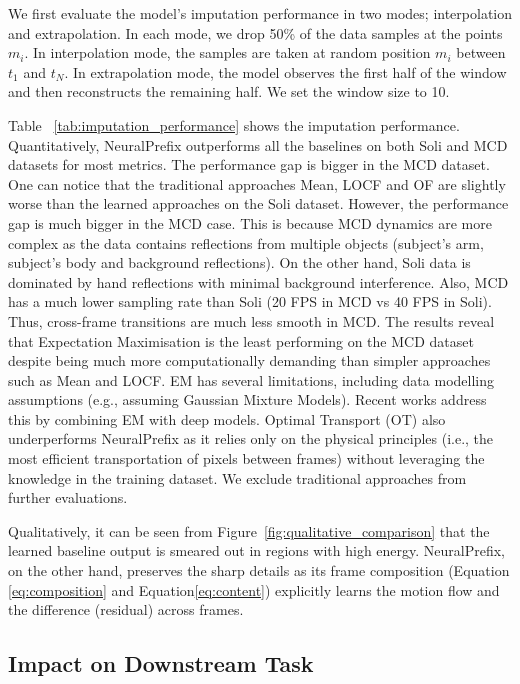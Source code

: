\documentclass[10pt, conference, compsocconf]{IEEEtran}
\def\update#1{#1}
\begin{document}
We first evaluate the model's imputation performance in two modes; interpolation and extrapolation. In each mode, we drop 50\% of the data samples at the points ${m_i}$. In interpolation mode, the samples are taken at random position ${m_i}$  between $t_1$ and $t_N$. In extrapolation mode, the model observes the first half of the window and then reconstructs the remaining half. We set the window size to 10.


Table~ \ref{tab:imputation_performance} shows the imputation performance.  \update {Quantitatively, NeuralPrefix outperforms all the baselines on both Soli and MCD datasets for most metrics. The performance gap is bigger in the MCD dataset. One can notice that the traditional approaches Mean, LOCF and OF are slightly worse than the learned approaches on the Soli dataset.  However, the performance gap is much bigger in the MCD case. This is because MCD dynamics are more complex as the data contains reflections from multiple objects (subject's arm, subject's body and background reflections). On the other hand, Soli data is dominated by hand reflections with minimal background interference. Also, MCD has a much lower sampling rate than Soli (20 FPS in MCD vs 40 FPS in Soli). Thus, cross-frame transitions are much less smooth in MCD.} 
\update{The results reveal that Expectation Maximisation is the least performing on the MCD dataset despite being much more computationally demanding than simpler approaches such as Mean and LOCF.  EM has several limitations, including data modelling assumptions (e.g., assuming Gaussian Mixture Models). Recent works \cite{ma2021emflow, richardson2020mcflow} address this by combining EM with deep models. Optimal Transport (OT) also underperforms NeuralPrefix as it relies only on the physical principles (i.e., the most efficient transportation of pixels between frames) without leveraging the knowledge in the training dataset. We exclude traditional approaches from further evaluations.}

Qualitatively, it can be seen from Figure~\ref{fig:qualitative_comparison} that the learned baseline output is smeared out in regions with high energy. NeuralPrefix, on the other hand, preserves the sharp details as its frame composition (Equation \eqref{eq:composition} and Equation\eqref{eq:content}) explicitly learns the motion flow and the difference (residual) across frames. 


\subsection{Impact on Downstream Task}
\label{sec:eval_downstream_task}
\end{document}
